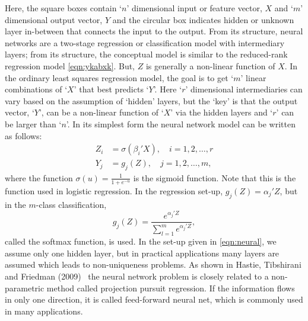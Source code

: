 Here, the square boxes contain `$n$' dimensional input or feature vector, $X$ and `$m$' dimensional output vector, $Y$ and the circular box indicates hidden or unknown layer in-between that connects the input to the output. From its structure, neural networks are a two-stage regression or classification model with intermediary layers; from its structure, the conceptual model is similar to the reduced-rank regression model \ref{eqn:ykabxk}. But, $Z$ is generally a non-linear function of $X$. In the ordinary least squares regression model, the goal is to get `$m$' linear combinations of `$X$' that best predicts `$Y$'. Here `$r$' dimensional intermediaries can vary based on the assumption of `hidden' layers, but the `key' is that the output vector, `$Y$', can be a non-linear function of `$X$' via the hidden layers and `$r$' can be larger than `$n$'. In its simplest form the neural network model can be written as follows:
	\begin{equation} \label{eqn:neurallabel}
	\begin{split}
	Z_i&= \sigma(\beta_i'X), \quad i=1,2,\ldots,r \\
	Y_j&= g_j(Z), \quad j=1,2,\ldots,m,
	\end{split}
	\end{equation}
where the function $\sigma(u)=\frac{1}{1+e^{-u}}$ is the sigmoid function. Note that this is the  function used in logistic regression. In the regression set-up, $g_j(Z)=\alpha_j' Z$, but in the $m$-class classification,
	\begin{equation} \label{eqn:gjzclass}
	g_j(Z)= \dfrac{e^{\alpha_j' Z}}{\displaystyle\sum_{l=1}^m e^{\alpha_j' Z}},
	\end{equation}
called the softmax function, is used. In the set-up given in \eqref{eqn:neural}, we assume only one hidden layer, but in practical applications many layers are assumed which leads to non-uniqueness problems. As shown in Hastie, Tibshirani and Friedman (2009)~\cite{hastibf} the neural network problem is closely related to a non-parametric method called projection pursuit regression. If the information flows in only one direction, it is called feed-forward neural net, which is commonly used in many applications.


